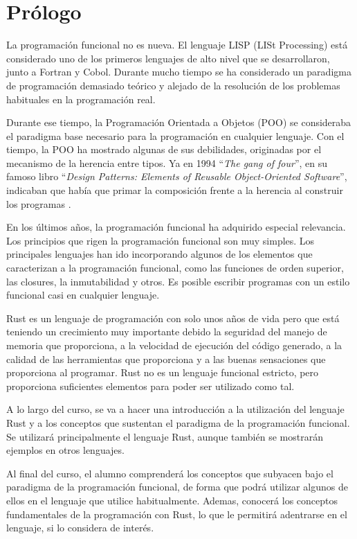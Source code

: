 \chapter*{Prólogo}
\label{sec_prologo}

\noindent La programación funcional no es nueva. El lenguaje LISP (LISt Processing) está considerado uno de los primeros lenguajes de alto nivel que se desarrollaron, junto a Fortran y Cobol. Durante mucho tiempo se ha considerado un paradigma de programación demasiado teórico y alejado de la resolución de los problemas habituales en la programación real.

\smallskip

Durante ese tiempo, la Programación Orientada a Objetos (POO) se consideraba el paradigma base necesario para la programación en cualquier lenguaje. Con el tiempo, la POO ha mostrado algunas de sus debilidades, originadas por el mecanismo de la herencia entre tipos. Ya en 1994 ``\textit{The gang of four}'', en su famoso libro ``\textit{Design Patterns: Elements of Reusable Object-Oriented Software}'',  indicaban que había que primar la composición frente a la herencia al construir los programas \citep{gammaDesignPatternsElements1994}. 

\smallskip

En los últimos años, la programación funcional ha adquirido especial relevancia. Los principios que rigen la programación funcional son muy simples. Los principales lenguajes han ido incorporando algunos de los elementos que caracterizan a la programación funcional, como las funciones de orden superior, las closures, la inmutabilidad y otros. Es posible escribir programas con un estilo funcional casi en cualquier lenguaje.

\smallskip

Rust es un lenguaje de programación con solo unos años de vida pero que está teniendo un crecimiento muy importante debido la seguridad del manejo de memoria que proporciona, a la velocidad de ejecución del código generado, a la calidad de las herramientas que proporciona y a las buenas sensaciones que proporciona al programar. Rust no es un lenguaje funcional estricto, pero proporciona suficientes elementos para poder ser utilizado como tal. 

\smallskip

A lo largo del curso, se va a hacer una introducción a la utilización del lenguaje Rust y a los conceptos que sustentan el paradigma de la programación funcional. Se utilizará principalmente el lenguaje Rust, aunque también se mostrarán ejemplos en otros lenguajes.

\smallskip

Al final del curso, el alumno comprenderá los conceptos que subyacen bajo el paradigma de la programación funcional, de forma que podrá utilizar algunos de ellos en el lenguaje que utilice habitualmente. Ademas, conocerá los conceptos fundamentales de la programación con Rust, lo que le permitirá adentrarse en el lenguaje, si lo considera de interés.

